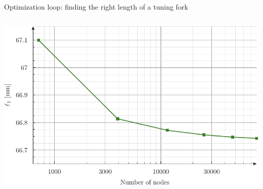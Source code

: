 \documentclass[
  ignorenonframetext,
  aspectratio=169,
]{beamer}
\begin{document}
\begin{frame}[fragile]{Optimization loop: finding the right length of a
tuning fork}
\begin{columns}[T]
\begin{column}{0.4\textwidth}
\includegraphics{fork.pdf}
\end{column}
\end{columns}
\end{frame}
\end{document}
